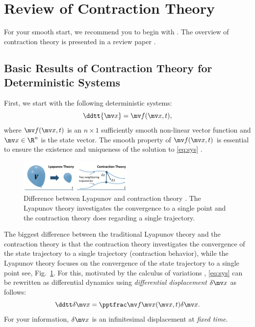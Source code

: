 
\section{Review of Contraction Theory}

For your smooth start, we recommend you to begin with \cite{LOHMILLER:1998aa}.
The overview of contraction theory is presented in a review paper \cite{Tsukamoto:2021aa}.

\subsection{Basic Results of Contraction Theory for Deterministic Systems}

First, we start with the following deterministic systems:
\begin{equation}
    \ddtt{\bdx}
    = 
    \bdf(\bdx,t)
    ,
    \label{eq:sys}
\end{equation}
where $\bdf(\bdx,t)$ is an $n\times1$ sufficiently smooth non-linear vector function and $\bdx\in\R^n$ is the state vector.
The smooth property of $\bdf(\bdx,t)$ is essential to ensure the existence and uniqueness of the solution to \eqref{eq:sys} \cite[see, pp. 88-89]{Khalil:2002aa}.

\begin{figure}[!t]
    \centering
    \includegraphics[width=0.5\textwidth]{figs/lyaVSctrac.png}
    \caption{
        Difference between Lyapunov and contraction theory \cite[Fig. 1]{Tsukamoto:2021aa}.
        The Lyapunov theory investigates the convergence to a single point and the contraction theory does regarding a single trajectory.
    }
    \label{fig:lyaVSctrac}
\end{figure}

The biggest difference between the traditional Lyapunov theory and the contraction theory is that the contraction theory investigates the convergence of the state trajectory to a single trajectory (contraction behavior), while the Lyapunov theory focuses on the convergence of the state trajectory to a single point \ie see, Fig.~\ref{fig:lyaVSctrac}.
For this, motivated by the calculus of variations \cite[Chap. 4]{Kirk:2004aa}, \eqref{eq:sys} can be rewritten as differential dynamics using \textit{differential displacement} $\delta\bdx$ as follows:
\begin{equation}
    \ddtt\delta\bdx
    =
    \tpfpx(\bdx,t)
    \delta\bdx
    .
    \label{eq:diff_sys}
\end{equation}
For your information, $\delta\bdx$ is an infinitesimal displacement at \textit{fixed time}.

